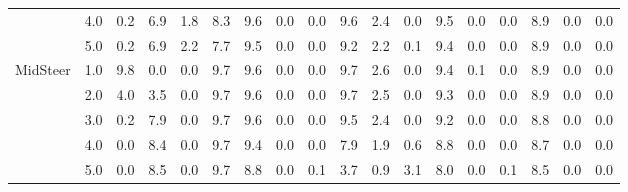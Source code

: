 \begin{table}
{\begin{tabular}{lc|cc|cc|ccc|ccc|ccc|ccc}
 & 4.0 & 0.2 & 6.9 & 1.8 & 8.3 & 9.6 & 0.0 & 0.0 & 9.6 & 2.4 & 0.0 & 9.5 & 0.0 & 0.0 & 8.9 & 0.0 & 0.0 \\
 & 5.0 & 0.2 & 6.9 & 2.2 & 7.7 & 9.5 & 0.0 & 0.0 & 9.2 & 2.2 & 0.1 & 9.4 & 0.0 & 0.0 & 8.9 & 0.0 & 0.0 \\
\cline{1-18}
\multirow{5}{*}{MidSteer} & 1.0 & 9.8 & 0.0 & 0.0 & 9.7 & 9.6 & 0.0 & 0.0 & 9.7 & 2.6 & 0.0 & 9.4 & 0.1 & 0.0 & 8.9 & 0.0 & 0.0 \\
 & 2.0 & 4.0 & 3.5 & 0.0 & 9.7 & 9.6 & 0.0 & 0.0 & 9.7 & 2.5 & 0.0 & 9.3 & 0.0 & 0.0 & 8.9 & 0.0 & 0.0 \\
 & 3.0 & 0.2 & 7.9 & 0.0 & 9.7 & 9.6 & 0.0 & 0.0 & 9.5 & 2.4 & 0.0 & 9.2 & 0.0 & 0.0 & 8.8 & 0.0 & 0.0 \\
 & 4.0 & 0.0 & 8.4 & 0.0 & 9.7 & 9.4 & 0.0 & 0.0 & 7.9 & 1.9 & 0.6 & 8.8 & 0.0 & 0.0 & 8.7 & 0.0 & 0.0 \\
 & 5.0 & 0.0 & 8.5 & 0.0 & 9.7 & 8.8 & 0.0 & 0.1 & 3.7 & 0.9 & 3.1 & 8.0 & 0.0 & 0.1 & 8.5 & 0.0 & 0.0 \\
\bottomrule
\end{tabular}}
\end{table}


